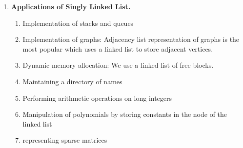 \documentclass[11pt]{article}
\begin{document}
\begin{enumerate}
\begin{enumerate}
\end{enumerate}
	\item \textbf{Applications of Singly Linked List.}\\
\begin{enumerate}
	\item Implementation of stacks and queues
	\item Implementation of graphs: Adjacency list representation of graphs is the most popular which uses a linked list to store adjacent vertices.
	\item Dynamic memory allocation: We use a linked list of free blocks.
	\item Maintaining a directory of names
	\item Performing arithmetic operations on long integers
	\item Manipulation of polynomials by storing constants in the node of the linked list
	\item representing sparse matrices
\end{enumerate}

\end{enumerate}
\end{document}
